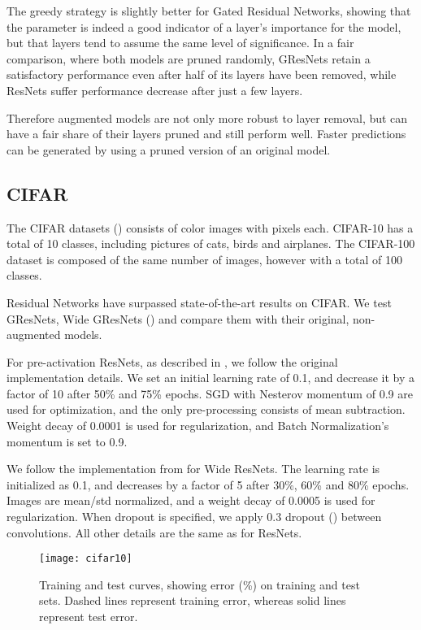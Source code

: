 \documentclass{article} \RequirePackage{amsmath,amsthm,amsfonts,amssymb}
\begin{document}
The greedy strategy is slightly better for Gated Residual Networks, showing that the  parameter is indeed a good indicator of a layer's importance for the model, but that layers tend to assume the same level of significance. In a fair comparison, where both models are pruned randomly, GResNets retain a satisfactory performance even after half of its layers have been removed, while ResNets suffer performance decrease after just a few layers.

Therefore augmented models are not only more robust to layer removal, but can have a fair share of their layers pruned and still perform well. Faster predictions can be generated by using a pruned version of an original model.



\subsection{CIFAR}

The CIFAR datasets (\cite{cifar}) consists of  color images with  pixels each. CIFAR-10 has a total of 10 classes, including pictures of cats, birds and airplanes. The CIFAR-100 dataset is composed of the same number of images, however with a total of 100 classes.

Residual Networks have surpassed state-of-the-art results on CIFAR. We test GResNets, Wide GResNets (\cite{wide}) and compare them with their original, non-augmented models.

For pre-activation ResNets, as described in \cite{resnet2}, we follow the original implementation details. We set an initial learning rate of 0.1, and decrease it by a factor of 10 after 50\% and 75\% epochs. SGD with Nesterov momentum of 0.9 are used for optimization, and the only pre-processing consists of mean subtraction. Weight decay of 0.0001 is used for regularization, and Batch Normalization's momentum is set to 0.9.

We follow the implementation from \cite{wide} for Wide ResNets. The learning rate is initialized as 0.1, and decreases by a factor of 5 after 30\%, 60\% and 80\% epochs. Images are mean/std normalized, and a weight decay of 0.0005 is used for regularization. When dropout is specified, we apply 0.3 dropout (\cite{dropout}) between convolutions. All other details are the same as for ResNets.

\begin{figure}[!ht]
  \centering
    \texttt{[image: cifar10]}
  \caption{Training and test curves, showing error (\%) on training and test sets. Dashed lines represent training error, whereas solid lines represent test error.}
\label{cifar}
\end{figure}
\end{document}
